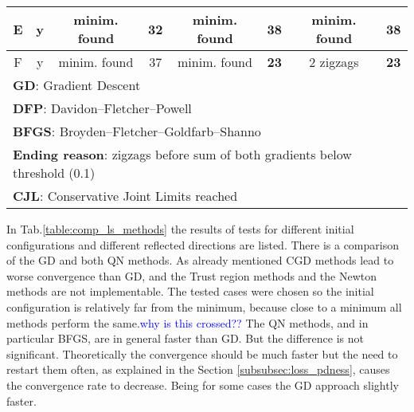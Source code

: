 \begin{table}[!h]
{\begin{tabular}{|c|c|c|c|c|c|c|c|}
			E                                                & y                                    & minim. found           & \cellcolor[HTML]{34FF34}\textbf{32} & minim. found           & 38                                  & minim. found           & 38                                  \\ \hline
			F                                                & y                                    & minim. found           & 37                                  & minim. found           & \cellcolor[HTML]{34FF34}\textbf{23} & 2 zigzags              & \cellcolor[HTML]{34FF34}\textbf{23} \\ \hline
			
			
			\multicolumn{8}{l}{\textbf{GD}: Gradient Descent}\\
			\multicolumn{8}{l}{\textbf{DFP}: Davidon–Fletcher–Powell}\\
			\multicolumn{8}{l}{\textbf{BFGS}: Broyden–Fletcher–Goldfarb–Shanno}\\
			\multicolumn{8}{l}{\textbf{Ending reason}: zigzags before sum of both gradients below threshold (0.1)}\\
			\multicolumn{8}{l}{\textbf{CJL}: Conservative Joint Limits reached}\\
		\end{tabular}%
			} 
\end{table}


In Tab.\ref{table:comp_ls_methods} the results of tests for different initial configurations and different reflected directions are listed. There is a comparison of the GD and both QN methods. As already mentioned CGD methods lead to worse convergence than GD, and the Trust region methods and the Newton methods are not implementable.
The tested cases were chosen so the initial configuration is relatively far from the minimum, because close to a minimum all methods perform the same.\textcolor{blue}{why is this crossed?? }
The QN methods, and in particular BFGS, are in general faster than GD. But the difference is not significant. Theoretically the convergence should be much faster but the need to restart them often, as explained in the Section \ref{subsubsec:loss_pdness}, causes the convergence rate to decrease. Being for some cases the GD approach slightly faster.

